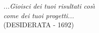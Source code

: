 
\pagestyle{empty}

\begin{flushright}
 \vskip 15cm 
 {\large \sl
 ...Gioisci dei tuoi risultati cos\`{\i}\\
 come dei tuoi progetti...\\}
 \vspace{.5cm}
 {\small 
 \rm (DESIDERATA - 1692)}
\end{flushright}

